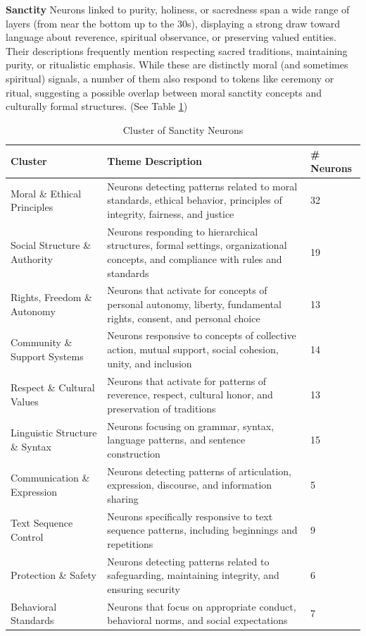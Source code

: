 \documentclass[runninghheads]{llncs}
\begin{document}
\textbf{Sanctity} Neurons linked to purity, holiness, or sacredness span a wide range of layers (from near the bottom up to the 30s), displaying a strong draw toward language about reverence, spiritual observance, or preserving valued entities. Their descriptions frequently mention respecting sacred traditions, maintaining purity, or ritualistic emphasis. While these are distinctly moral (and sometimes spiritual) signals, a number of them also respond to tokens like ceremony or ritual, suggesting a possible overlap between moral sanctity concepts and culturally formal structures. (See Table \ref{tab:sanctity})


\begin{table}[!ht]
    \centering
    \caption{Cluster of Sanctity Neurons}
    \begin{tabular}{|p{3cm}|p{8cm}|p{1cm}|}
    \hline
        Cluster & Theme Description & \# Neurons \\ \hline
        Moral \& Ethical Principles & Neurons detecting patterns related to moral standards, ethical behavior, principles of integrity, fairness, and justice & 32 \\ \hline
        Social Structure \& Authority & Neurons responding to hierarchical structures, formal settings, organizational concepts, and compliance with rules and standards & 19 \\ \hline
        Rights, Freedom \& Autonomy & Neurons that activate for concepts of personal autonomy, liberty, fundamental rights, consent, and personal choice & 13 \\ \hline
        Community \& Support Systems & Neurons responsive to concepts of collective action, mutual support, social cohesion, unity, and inclusion & 14 \\ \hline
        Respect \& Cultural Values & Neurons that activate for patterns of reverence, respect, cultural honor, and preservation of traditions & 13 \\ \hline
        Linguistic Structure \& Syntax & Neurons focusing on grammar, syntax, language patterns, and sentence construction & 15 \\ \hline
        Communication \& Expression & Neurons detecting patterns of articulation, expression, discourse, and information sharing & 5\\ \hline
        Text Sequence Control & Neurons specifically responsive to text sequence patterns, including beginnings and repetitions & 9 \\ \hline
        Protection \& Safety & Neurons detecting patterns related to safeguarding, maintaining integrity, and ensuring security & 6 \\ \hline
        Behavioral Standards & Neurons that focus on appropriate conduct, behavioral norms, and social expectations & 7 \\ \hline
    \end{tabular}
    \label{tab:sanctity}
\end{table}
\end{document}
